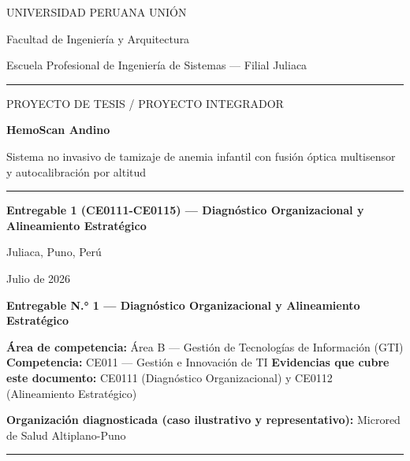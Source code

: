 \documentclass[11pt,a4paper]{article}
\begin{document}
\begin{titlepage}
\centering
\vspace*{1.2cm}
{\large UNIVERSIDAD PERUANA UNI\'ON\par}
{\normalsize Facultad de Ingenier\'ia y Arquitectura\par}
{\normalsize Escuela Profesional de Ingenier\'ia de Sistemas --- Filial Juliaca\par}
\vspace{0.5cm}
\rule{0.6\linewidth}{0.4pt}
\vspace{1.6cm}

{\large PROYECTO DE TESIS / PROYECTO INTEGRADOR\par}
\vspace{1.0cm}
{\huge\bfseries HemoScan Andino\par}
\vspace{0.6cm}
{\Large Sistema no invasivo de tamizaje de anemia infantil con fusi\'on \'optica multisensor y autocalibraci\'on por altitud\par}
\vspace{1.6cm}
\rule{0.6\linewidth}{0.4pt}
\vspace{1.6cm}

{\Large\bfseries Entregable 1 (CE0111-CE0115) --- Diagn\'ostico Organizacional y Alineamiento Estrat\'egico\par}
\vspace{2.0cm}

{\normalsize Juliaca, Puno, Per\'u \par}
{\normalsize Julio de 2026\par}

\vfill
\end{titlepage}

\tableofcontents
\newpage

\textbf{Entregable N.° 1 --- Diagnóstico Organizacional y Alineamiento Estratégico}

\textbf{Área de competencia:} Área B --- Gestión de Tecnologías de Información (GTI)
\textbf{Competencia:} CE011 --- Gestión e Innovación de TI
\textbf{Evidencias que cubre este documento:} CE0111 (Diagnóstico Organizacional) y CE0112 (Alineamiento Estratégico)

\textbf{Organización diagnosticada (caso ilustrativo y representativo):} Microred de Salud Altiplano-Puno

\begin{center}\rule{0.5\linewidth}{0.5pt}\end{center}
\end{document}
